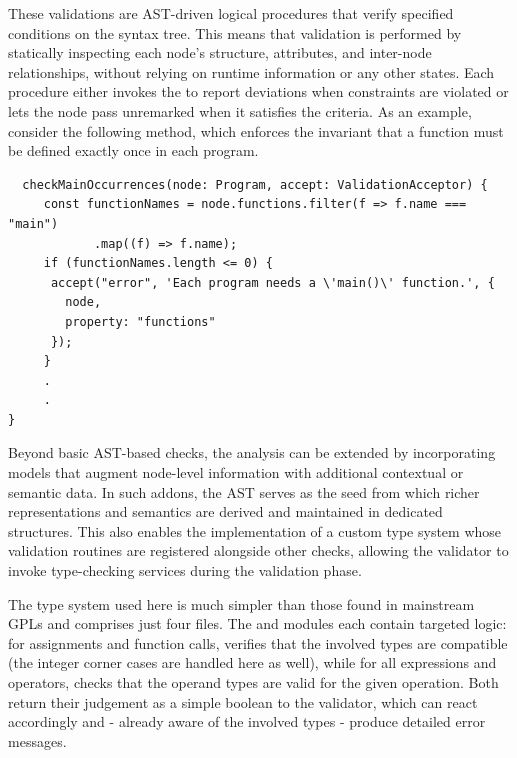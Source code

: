 These validations are AST-driven logical procedures that verify specified conditions on the syntax tree. This means that validation is performed by statically inspecting
each node's structure, attributes, and inter-node relationships, without relying on runtime information or any other states.
Each procedure either invokes the  to report deviations when constraints are violated or lets the node pass unremarked when it
satisfies the criteria. As an example, consider the following  method, which enforces the invariant that a  function must be defined exactly once in each program.
\begin{verbatim}
  checkMainOccurrences(node: Program, accept: ValidationAcceptor) {
     const functionNames = node.functions.filter(f => f.name === "main")
            .map((f) => f.name);
     if (functionNames.length <= 0) {
      accept("error", 'Each program needs a \'main()\' function.', {
        node,
        property: "functions"
      });
     }
     .
     .
}
\end{verbatim}
\vspace{1em}

Beyond basic AST-based checks, the analysis can be extended by incorporating models that augment node-level information with additional contextual or semantic data.
In such addons, the AST serves as the seed from which richer representations and semantics are derived and maintained in dedicated structures.
This also enables the implementation of a custom type system whose validation routines are registered alongside other checks, allowing the validator to
invoke type-checking services during the validation phase.

The type system used here is much simpler than those found in mainstream GPLs and comprises just four files. The  and 
modules each contain targeted logic: for assignments and function calls,  verifies that the involved types are compatible (the integer corner cases are handled here as well),
while for all expressions and operators,  checks that the operand types are valid for the given operation. Both return their judgement as a simple boolean to
the validator, which can react accordingly and - already aware of the involved types - produce detailed error messages.

